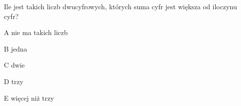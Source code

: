 \begin{tresc}
Ile jest takich liczb dwucyfrowych, których suma cyfr jest większa od iloczynu cyfr?
\end{tresc}
\begin{wariant}{A} nie ma takich liczb \end{wariant}
\begin{wariant}{B} jedna \end{wariant}
\begin{wariant}{C} dwie \end{wariant}
\begin{wariant}{D} trzy \end{wariant}
\begin{wariant}{E} więcej niż trzy \end{wariant}
